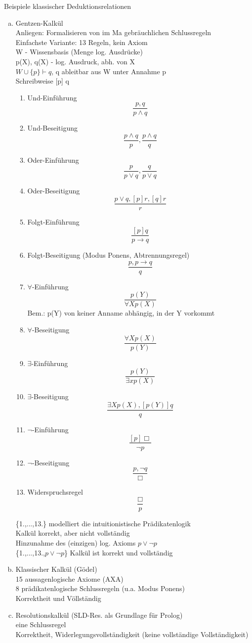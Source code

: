 \documentclass[a4paper,14pt]{article}
\begin{document}
Beispiele klassischer Deduktionsrelationen\\
\begin{enumerate}[(a)]
  \item Gentzen-Kalkül\\
	Anliegen: Formalisieren von im Ma gebräuchlichen Schlussregeln\\
	Einfachste Variante: 13 Regeln, kein Axiom\\
	W - Wissensbasis (Menge log. Ausdrücke)\\
	p(X), q(X) - log. Ausdruck, abh. von X\\
	$W \cup \{p\} \vdash q$, q ableitbar aus W unter Annahme p\\
	Schreibweise [p] q
	\begin{enumerate}[(1)]
	  \item	Und-Einführung\\
		$$\frac{p, q}{p\land q}$$ 
	  \item Und-Beseitigung
		$$\frac{p\land q}{p}, \frac{p\land q}{q}$$
	  \item Oder-Einführung
		$$\frac{p}{p\lor q}, \frac{q}{p\lor q}$$
	  \item Oder-Beseitigung
		$$\frac{p\lor q,[p]r,[q]r}{r}$$
	  \item Folgt-Einführung
		$$\frac{[p]q}{p\rightarrow q}$$
	  \item Folgt-Beseitigung (Modus Ponens, Abtrennungsregel)
		$$\frac{p,p\rightarrow q}{q}$$
	  \item	$\forall$-Einführung
		$$\frac{p(Y)}{\forall X p(X)}$$
		Bem.: p(Y) von keiner Anname abhängig, in der Y vorkommt
	  \item $\forall$-Beseitigung
		$$\frac{\forall X p(X)}{p(Y)}$$
	  \item $\exists$-Einführung
		$$\frac{p(Y)}{\exists x p(X)}$$
	  \item $\exists$-Beseitigung
		$$\frac{\exists X p(X),[p(Y)]q}{q}$$
	  \item $\neg$-Einführung
		$$\frac{[p]\Box}{\neg p}$$
	  \item	$\neg$-Beseitigung
		$$\frac{p, \neg q}{\Box}$$
	  \item Widerspruchsregel
		$$\frac{\Box}{p}$$
	\end{enumerate}
	\{1.,...,13.\} modelliert die intuitionistische Prädikatenlogik\\
	Kalkül korrekt, aber nicht vollständig\\
	Hinzunahme des (einzigen) log. Axioms $p\lor\neg p$\\
	\{1.,...,13.,$p\lor\neg p$\}
	Kalkül ist korrekt und vollständig
  \item	Klassischer Kalkül (Gödel)\\
	15 aussagenlogische Axiome (AXA)\\
	8 prädikatenlogische Schlussregeln (u.a. Modus Ponens)\\
	Korrektheit und Völlständig
  \item	Resolutionskalkül (SLD-Res. als Grundlage für Prolog)\\
	eine Schlussregel\\
	Korrektheit, Widerlegungsvollständigkeit (keine \glqq{}vollständige\grqq{} Vollständigkeit)
\end{enumerate}
\end{document}
